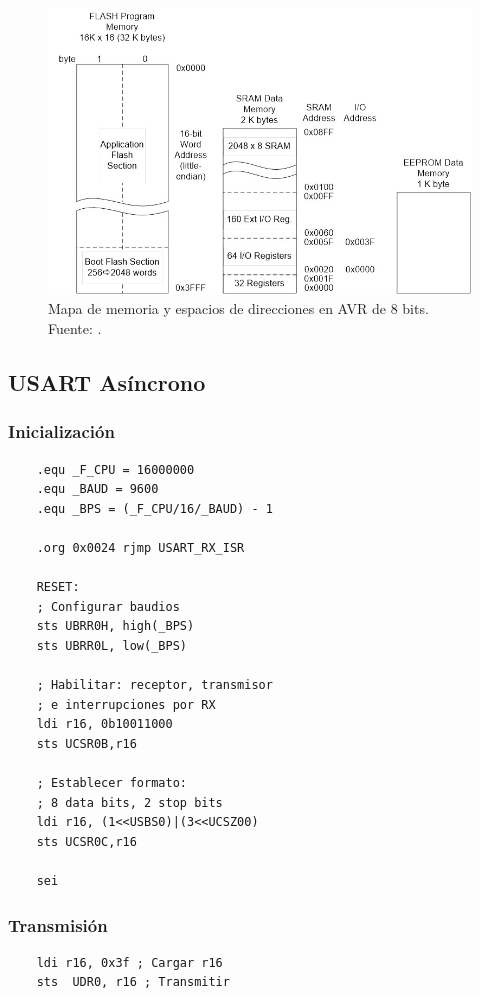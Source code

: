 \begin{figure}[H]
  \centering
  \includegraphics[width=\linewidth]{./Anexos/Memory Map.jpg}
  \caption{Mapa de memoria y espacios de direcciones en AVR de 8 bits. Fuente: \cite{arxterra_avr_addressing_modes}.}
  \label{fig:avr-memory-map}
\end{figure}


\subsection{USART Asíncrono}
    \subsubsection{Inicialización}
    \begin{verbatim}
    .equ _F_CPU = 16000000
    .equ _BAUD = 9600
    .equ _BPS = (_F_CPU/16/_BAUD) - 1

    .org 0x0024 rjmp USART_RX_ISR
    
    RESET:
    ; Configurar baudios
    sts UBRR0H, high(_BPS)
    sts UBRR0L, low(_BPS)

    ; Habilitar: receptor, transmisor
    ; e interrupciones por RX
    ldi r16, 0b10011000
    sts UCSR0B,r16

    ; Establecer formato:
    ; 8 data bits, 2 stop bits
    ldi r16, (1<<USBS0)|(3<<UCSZ00)
    sts UCSR0C,r16

    sei
    \end{verbatim}
    \subsubsection{Transmisión}
    \begin{verbatim}
    ldi r16, 0x3f ; Cargar r16 
    sts  UDR0, r16 ; Transmitir
    \end{verbatim}
